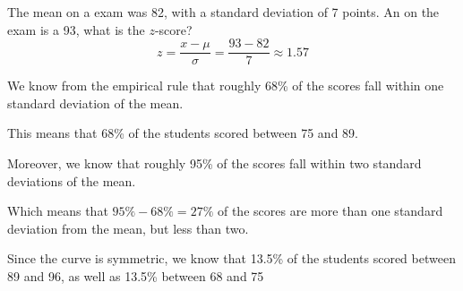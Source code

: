 \documentclass{beamer}
\begin{document}
\begin{frame}
\begin{example}
The mean on a exam was 82, with a standard deviation of 7 points. An  on the exam is a 93, what is the $z$-score?\pause
\begin{equation*}
z=\dfrac{x-\mu}{\sigma}=\dfrac{93-82}{7}\approx 1.57
\end{equation*}
\end{example}\pause

\begin{note}
We know from the empirical rule that roughly 68\% of the scores fall within one standard deviation of the mean.\pause 

\vspace{1mm}
This means that 68\% of the students scored between 75 and 89.\pause

\vspace{1mm}
Moreover, we know that roughly 95\% of the scores fall within two standard deviations of the mean. \pause

\vspace{1mm}
Which means that $95\%-68\%=27\%$ of the scores are more than one standard deviation from the mean, but less than two. \pause

\vspace{1mm}
Since the curve is symmetric, we know that 13.5\% of the students scored between 89 and 96, as well as 13.5\% between 68 and 75
\end{note}
\end{frame}
\end{document}
